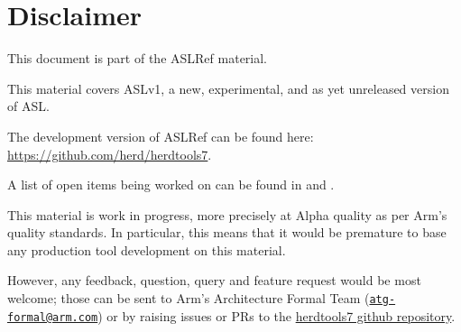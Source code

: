 \chapter{Disclaimer}

This document is part of the ASLRef material.

This material covers ASLv1, a new, experimental, and as yet unreleased version of ASL.

The development version of ASLRef can be found here: \\
\url{https://github.com/herd/herdtools7}.

A list of open items being worked on can be found in 
and .

This material is work in progress, more precisely at Alpha quality as
per Arm’s quality standards. In particular, this means that it would be
premature to base any production tool development on this material.

However, any feedback, question, query and feature request would be most
welcome; those can be sent to Arm’s Architecture Formal Team
(\href{mailto:atg-formal@arm.com}{\tt atg-formal@arm.com})
or by raising issues or PRs to the
\href{https://github.com/herd/herdtools7}{herdtools7 github repository}.
